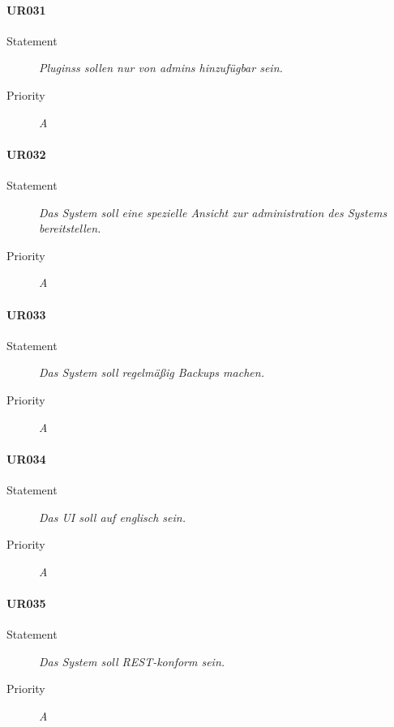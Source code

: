 \paragraph{UR031}
\begin{description}
\item[Statement] \textit{\glspl{Plugins} sollen nur von \glspl{admin} hinzufügbar sein.}
\item[Priority] \textit{A}
\end{description}

\paragraph{UR032}
\begin{description}
\item[Statement] \textit{Das System soll eine spezielle Ansicht zur administration des Systems bereitstellen.}
\item[Priority] \textit{A}
\end{description}

\paragraph{UR033}
\begin{description}
\item[Statement] \textit{Das System soll regelmäßig \glspl{Backup} machen.}%
\item[Priority] \textit{A}
\end{description}

\paragraph{UR034}
\begin{description}
\item[Statement] \textit{Das \gls{UI} soll auf englisch sein.}
\item[Priority] \textit{A}
\end{description}

\paragraph{UR035}
\begin{description}
\item[Statement] \textit{Das System soll \gls{REST}-konform sein.}
\item[Priority] \textit{A}
\end{description}


